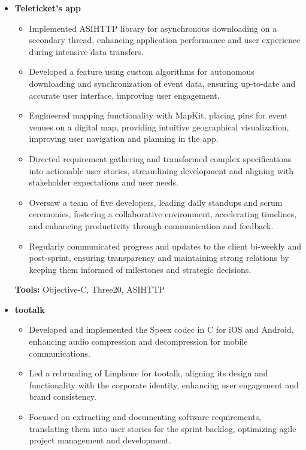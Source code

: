 \documentclass[11pt,a4paper,english]{moderncv}
\begin{document}
{
\begin{itemize}
    \item \textbf{Teleticket’s app}
        \begin{itemize}
            \item Implemented ASIHTTP library for asynchronous downloading on a secondary thread, enhancing application performance and user experience during intensive data transfers.
            \item Developed a feature using custom algorithms for autonomous downloading and synchronization of event data, ensuring up-to-date and accurate user interface, improving user engagement.
            \item Engineered mapping functionality with MapKit, placing pins for event venues on a digital map, providing intuitive geographical visualization, improving user navigation and planning in the app.
            \item Directed requirement gathering and transformed complex specifications into actionable user stories, streamlining development and aligning with stakeholder expectations and user needs.
            \item Oversaw a team of five developers, leading daily standups and scrum ceremonies, fostering a collaborative environment, accelerating timelines, and enhancing productivity through communication and feedback.
            \item Regularly communicated progress and updates to the client bi-weekly and post-sprint, ensuring transparency and maintaining strong relations by keeping them informed of milestones and strategic decisions.
        \end{itemize}
        \textbf{Tools:} Objective-C, Three20, ASIHTTP
    \item \textbf{tootalk}
        \begin{itemize}
            \item Developed and implemented the Speex codec in C for iOS and Android, enhancing audio compression and decompression for mobile communications.
            \item Led a rebranding of Linphone for tootalk, aligning its design and functionality with the corporate identity, enhancing user engagement and brand consistency.
            \item Focused on extracting and documenting software requirements, translating them into user stories for the sprint backlog, optimizing agile project management and development.

\end{itemize}
\end{itemize}}
\end{document}
